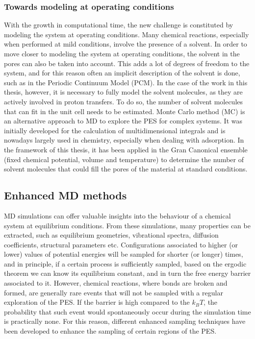 \subsubsection*{Towards modeling at operating conditions}
With the growth in computational time, the new challenge is constituted by modeling the system at operating conditions. Many chemical reactions, especially when performed at mild conditions, involve the presence of a solvent. In order to move closer to modeling the system at operating conditions, the solvent in the pores can also be taken into account. This adds a lot of degrees of freedom to the system, and for this reason often an implicit description of the solvent is done, such as in the Periodic Continuum Model (PCM). In the case of the work in this thesis, however, it is necessary to fully model the solvent molecules, as they are actively involved in proton transfers. 
To do so, the number of solvent molecules that can fit in the unit cell needs to be estimated. Monte Carlo method (MC) is an alternative approach to MD to explore the PES for complex systems. It was initially developed for the calculation of multidimensional integrals and is nowadays largely used in chemistry, especially when dealing with adsorption. In the framework of this thesis, it has been applied in the Gran Canonical ensemble (fixed chemical potential, volume and temperature) to determine the number of solvent molecules that could fill the pores of the material at standard conditions.

\subsection*{Enhanced MD methods}
MD simulations can offer valuable insights into the behaviour of a chemical system at equilibrium conditions. From these simulations, many properties can be extracted, such as equilibrium geometries, vibrational spectra, diffusion coefficients, structural parameters etc. Configurations associated to higher (or lower) values of potential energies will be sampled for shorter (or longer) times, and in principle, if a certain process is sufficiently sampled, based on the ergodic theorem we can know its equilibrium constant, and in turn the free energy barrier associated to it. However, chemical reactions, where bonds are broken and formed, are generally rare events that will not be sampled with a regular exploration of the PES. If the barrier is high compared to the $k_{B}T$, the probability that such event would spontaneously occur during the simulation time is practically none. For this reason, different enhanced sampling techniques have been developed to enhance the sampling of certain regions of the PES. 

